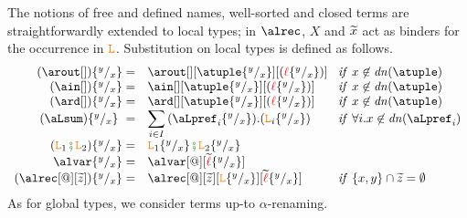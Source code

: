 The notions of free and defined names, well-sorted and closed terms
are straightforwardly extended to local types; in $\alrec$, $X$ and
$\widetilde{x}$ act as binders for the occurrence in $\texttt{\textcolor{orange}L}$.
%
%
%
Substitution on local types is defined as follows.
% 
 \[
\begin{array}{rl@{\hspace{.3cm}}l}
  (\arout[]) \sust x y  = &  \arout[][\atuple\sust x y][(\alocvar\sust x y)] &  {\it if}\  x\not\in\dn\atuple
  \\
  (\ain[]) \sust x y  = &  \ain[][\atuple\sust x y][(\alocvar\sust x y)] &  {\it if}\  x\not\in\dn\atuple
  \\
  (\ard[]) \sust x y  = &  \ard[][\atuple\sust x y][(\alocvar\sust x y)] &  {\it if}\  x\not\in\dn\atuple
  \\
   (\aLsum)\sust x y  = & \displaystyle{\sum_{i\in I} {(\aLpref_{i}\sust x y).(\aL_{i}\sust x y)}}
   &  {\it if}\  \forall i. x\not\in\dn{\aLpref_i}
  \\
  (\aL_1\lseqop\aL_2)\sust x y  = &  \aL_1\sust x y\lseqop  \aL_2\sust x y 
  \\
  \alvar\sust x y  = & \alvar[@][\seq\alocvar\sust x y]  
  \\
  (\alrec[@][\seq z])\sust x y  = & \alrec[@][\seq z][\aL\sust x y][\seq\alocvar\sust x y] &  {\it if}\  \{x,y\}\cap\seq z = \emptyset
\end{array}
\]
%
%
%
%
%
As for global types, we consider terms up-to $\alpha$-renaming.
 
